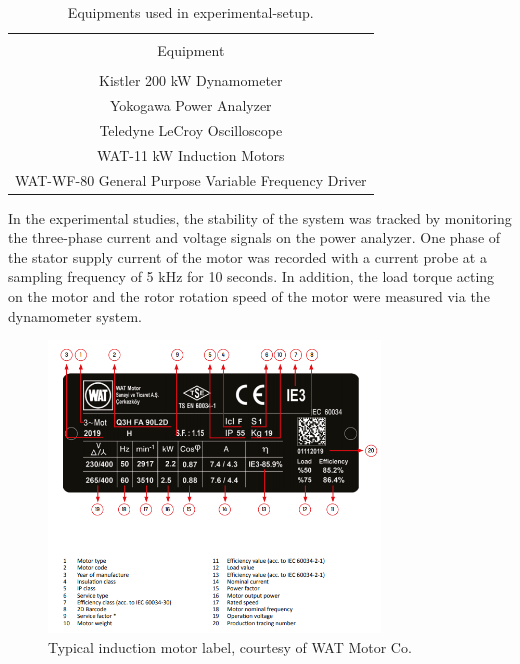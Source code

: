 \begin{table}[h]
	{\setlength{\tabcolsep}{12pt}
		\caption{Equipments used in experimental-setup.}
		\begin{center}
			\vspace{-6mm}
			\begin{tabular}{c}
				\hline \\[-2.45ex] \hline \\[-2.1ex]
				Equipment\\
				\hline \\[-1.8ex]
				Kistler 200 kW Dynamometer  \\
				Yokogawa Power Analyzer  \\
				Teledyne LeCroy Oscilloscope  \\
				WAT-11 kW Induction Motors   \\
				WAT-WF-80 General Purpose Variable Frequency Driver   \\
				\hline
			\end{tabular}
			\vspace{-6mm}
		\end{center}
		\label{Table3.1}}
\end{table}

In the experimental studies, the stability of the system was tracked by monitoring the three-phase current and voltage signals on the power analyzer. One phase of the stator supply current of the motor was recorded with a current probe at a sampling frequency of 5 kHz for 10 seconds. In addition, the load torque acting on the motor and the rotor rotation speed of the motor were measured via the dynamometer system.

\begin{figure}[h]
	\centering
	\includegraphics[width=250pt,keepaspectratio=true]{./fig/plate.PNG}
	\caption{Typical induction motor label, courtesy of WAT Motor Co.}	
	\label{plate}
\end{figure}

